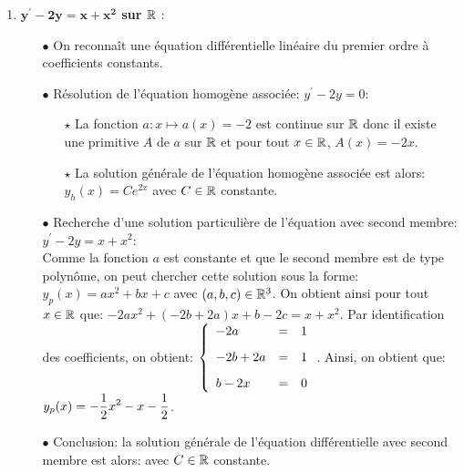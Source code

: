 \documentclass[a4paper, 11pt,reqno]{article}
\begin{document}
\begin{correction}
\begin{enumerate}
 \item \textbf{$\mathbf{y^{\prime}-2y=x+x^2}$ sur $\mathbb{R}$} :\\
 \begin{itemize}
\item[$\bullet$] On reconna\^{i}t une \'equation diff\'erentielle lin\'eaire du premier ordre \`{a} coefficients  constants.
\item[$\bullet$] R\'esolution de l'\'equation homog\`{e}ne associ\'ee: $y^{\prime}-2y=0$:\\
\begin{itemize}
\item[$\star$] La fonction $a: x\mapsto a(x)=-2$ est continue sur $\mathbb{R}$ donc il existe une primitive $A$ de $a$ sur $\mathbb{R}$ et pour tout $x\in\mathbb{R}$, $A(x)=-2x$.
\item[$\star$] La solution g\'en\'erale de l'\'equation homog\`{e}ne associ\'ee est alors: $y_h(x) = Ce^{2x}$ avec $C\in\mathbb{R}$ constante.
\end{itemize}
\item[$\bullet$] Recherche d'une solution particuli\`{e}re de l'\'equation avec second membre: $y^{\prime}-2y=x+x^2$:\\
\noindent Comme la fonction $a$ est constante et que le second membre est de type polyn\^{o}me, on peut chercher cette solution sous la forme: $y_p(x)= ax^2+bx+c$ avec $(a,b,c)\in\mathbb{R}^3$. On obtient ainsi pour tout $x\in\mathbb{R}$ que: $-2ax^2+(-2b+2a)x+b-2c=x+x^2$. Par identification des coefficients, on obtient: 
$\left\lbrace \begin{array}{lll}  -2a&=&1\vsec\\ -2b+2a&=&1\vsec\\ b-2x&=&0\end{array} \right.$. Ainsi, on obtient que: $y_p(x)= -\displaystyle\frac{1}{2} x^2-x-\displaystyle\frac{1}{2}$.
\item[$\bullet$] Conclusion: la solution g\'en\'erale de l'\'equation diff\'erentielle avec second membre est alors:  avec $C\in\mathbb{R}$ constante.
\end{itemize}



\end{enumerate}
\end{correction}
\end{document}
